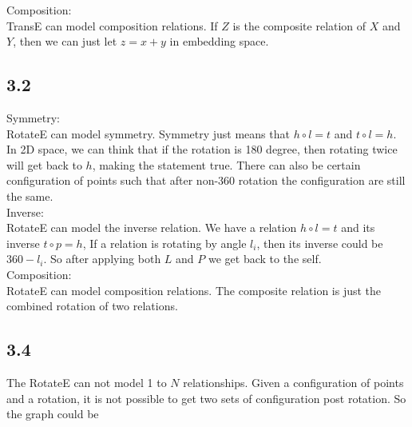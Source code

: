 \documentclass{book}
\begin{document}
Composition: \\
TransE can model composition relations. If $Z$ is the composite relation of $X$ and $Y$, then we can just let $z = x + y$ in embedding space. 

\subsection*{3.2}
Symmetry: \\
RotateE can model symmetry. Symmetry just means that $h \circ l = t$ and $t \circ l = h$. In 2D space, we can think that if the rotation is 180 degree, then rotating twice will get back to $h$, making the statement true. There can also be certain configuration of points such that after non-360 rotation the configuration are still the same.   \\


Inverse: \\
RotateE can model the inverse relation. We have a relation $h \circ l = t$ and its inverse $t \circ p = h$, If a relation is rotating by angle $l_i$, then its inverse could be $360 - l_i$. So after applying both $L$ and $P$ we get back to the self. \\



Composition: \\
RotateE can model composition relations. The composite relation is just the combined rotation of two relations. \\

\subsection*{3.4}
The RotateE can not model 1 to $N$ relationships. Given a configuration of points and a rotation, it is not possible to get two sets of configuration post rotation. So the graph could be 
\end{document}
